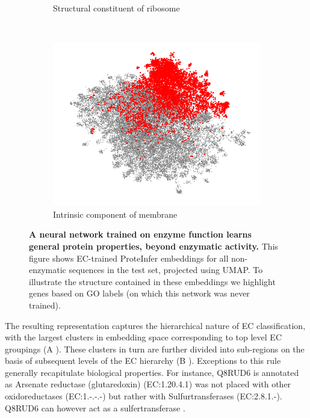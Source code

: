 \begin{figure}[t!]
\begin{subfigure}[t]{0.3\textwidth}
        \caption{Structural constituent of ribosome}
        \label{fig:tiger}
    \end{subfigure}
    ~ %
    \begin{subfigure}[t]{0.3\textwidth}
    \vskip 0pt
        \includegraphics[width=\textwidth]{Figures/membrane}
        \caption{Intrinsic component of membrane}
        \label{fig:mouse}
    \end{subfigure}
    \caption{\textbf{A neural network trained on enzyme function learns general protein properties, beyond enzymatic activity.} This figure shows EC-trained ProteInfer embeddings for all non-enzymatic sequences in the test set, projected using UMAP. To illustrate the structure contained in these embeddings we highlight genes based on GO labels (on which this network was never trained).}\label{fig:unsupervised_embedding}
\end{figure}
The resulting representation captures the hierarchical nature of EC classification, with the largest clusters in embedding space corresponding to top level EC groupings (A%
). These clusters in turn are further divided into sub-regions on the basis of subsequent levels of the EC hierarchy (B%
). Exceptions to this rule generally recapitulate biological properties. For instance, Q8RUD6 is annotated as Arsenate reductase (glutaredoxin) (EC:1.20.4.1) \cite{pmid25464340} was not placed with other oxidoreductases (EC:1.-.-.-) but rather with Sulfurtransferases (EC:2.8.1.-). Q8RUD6 can however act as a sulfertransferase \cite{pmid17408957}. 


